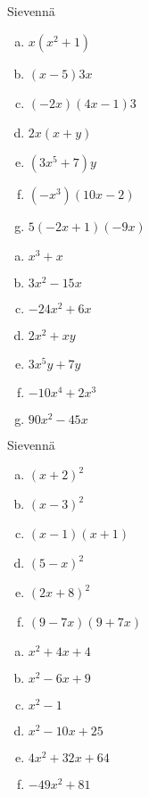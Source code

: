 \begin{tehtava}
    Sievennä
    \begin{enumerate}[a)]
        \item $x(x^2 + 1)$
        \item $(x - 5)3x$
        \item $(-2x)(4x - 1)3$
        \item $2x(x + y)$
        \item $(3x^5 + 7)y$
        \item $(-x^3)(10x - 2)$
        \item $5(-2x + 1)(-9x) $
    \end{enumerate}
    \begin{vastaus}
        \begin{enumerate}[a)]
            \item $x^3 + x$
            \item $3x^2 - 15x$
            \item $-24x^2 + 6x$
            \item $2x^2 + xy$
            \item $3x^5y + 7y$
            \item $-10x^4 + 2x^3$
            \item $90x^2 - 45x$
        \end{enumerate}
    \end{vastaus}
\end{tehtava}

\begin{tehtava}
    Sievennä
    \begin{enumerate}[a)]
        \item $(x+2)^2$
        \item $(x-3)^2$
        \item $(x-1)(x+1)$
        \item $(5-x)^2$
        \item $(2x + 8)^2$
        \item $(9 - 7x)(9 + 7x)$
    \end{enumerate}
    \begin{vastaus}
        \begin{enumerate}[a)]
            \item $x^2 + 4x + 4$
            \item $x^2 - 6x + 9$
            \item $x^2 - 1$
            \item $x^2 - 10x + 25$
            \item $4x^2 + 32x + 64$
            \item $-49x^2 + 81$
        \end{enumerate}
    \end{vastaus}
\end{tehtava}

